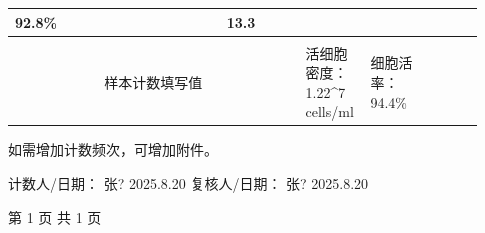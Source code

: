 \documentclass[UTF8,10pt,a4paper,fontset=fandol]{ctexart}
\newcommand{\fieldvalue}[1]{#1}
\newcommand{\handwritten}[1]{#1}
\begin{document}
\begin{center}
\begin{tabular}{|p{0.43\linewidth}|p{0.16\linewidth}|p{0.11\linewidth}|p{0.14\linewidth}|p{0.09\linewidth}|}
\fieldvalue{\handwritten{92.8}}\%
&
\fieldvalue{\handwritten{13.3}}
& \\ \hline
\multicolumn{5}{|c|}{\rule{0pt}{1.2cm}} \\ \hline
\multicolumn{2}{|c|}{样本计数填写值}
&
活细胞密度：
\fieldvalue{\handwritten{1.22}}\times10^7 cells/ml
&
细胞活率：
\fieldvalue{\handwritten{94.4}}\%
& \\ \hline
\end{tabular}
\end{center}

\noindent
如需增加计数频次，可增加附件。

\noindent
计数人/日期：
\fieldvalue{\handwritten{张?}}
\quad
\fieldvalue{\handwritten{2025.8.20}}
\hfill
复核人/日期：
\fieldvalue{\handwritten{张?}}
\quad
\fieldvalue{\handwritten{2025.8.20}}

\begin{center}
第 1 页 共 1 页
\end{center}

\newpage
\end{document}
